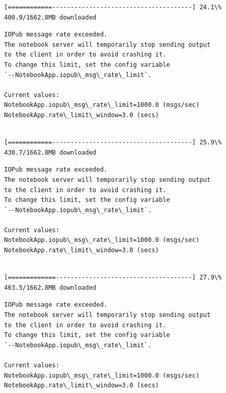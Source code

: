 \documentclass[11pt]{article}
\begin{document}
    \begin{Verbatim}[commandchars=\\\{\}]
[============--------------------------------------] 24.1\% 400.9/1662.8MB downloaded
    \end{Verbatim}

    \begin{Verbatim}[commandchars=\\\{\}]
IOPub message rate exceeded.
The notebook server will temporarily stop sending output
to the client in order to avoid crashing it.
To change this limit, set the config variable
`--NotebookApp.iopub\_msg\_rate\_limit`.

Current values:
NotebookApp.iopub\_msg\_rate\_limit=1000.0 (msgs/sec)
NotebookApp.rate\_limit\_window=3.0 (secs)


    \end{Verbatim}

    \begin{Verbatim}[commandchars=\\\{\}]
[============--------------------------------------] 25.9\% 430.7/1662.8MB downloaded
    \end{Verbatim}

    \begin{Verbatim}[commandchars=\\\{\}]
IOPub message rate exceeded.
The notebook server will temporarily stop sending output
to the client in order to avoid crashing it.
To change this limit, set the config variable
`--NotebookApp.iopub\_msg\_rate\_limit`.

Current values:
NotebookApp.iopub\_msg\_rate\_limit=1000.0 (msgs/sec)
NotebookApp.rate\_limit\_window=3.0 (secs)


    \end{Verbatim}

    \begin{Verbatim}[commandchars=\\\{\}]
[=============-------------------------------------] 27.9\% 463.5/1662.8MB downloaded
    \end{Verbatim}

    \begin{Verbatim}[commandchars=\\\{\}]
IOPub message rate exceeded.
The notebook server will temporarily stop sending output
to the client in order to avoid crashing it.
To change this limit, set the config variable
`--NotebookApp.iopub\_msg\_rate\_limit`.

Current values:
NotebookApp.iopub\_msg\_rate\_limit=1000.0 (msgs/sec)
NotebookApp.rate\_limit\_window=3.0 (secs)


    \end{Verbatim}
\end{document}
